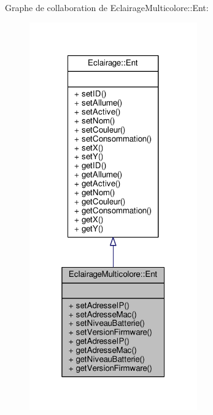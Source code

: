 Graphe de collaboration de Eclairage\+Multicolore\+:\+:Ent\+:\nopagebreak
\begin{figure}[H]
\begin{center}
\leavevmode
\includegraphics[width=205pt]{classEclairageMulticolore_1_1Ent__coll__graph}
\end{center}
\end{figure}
